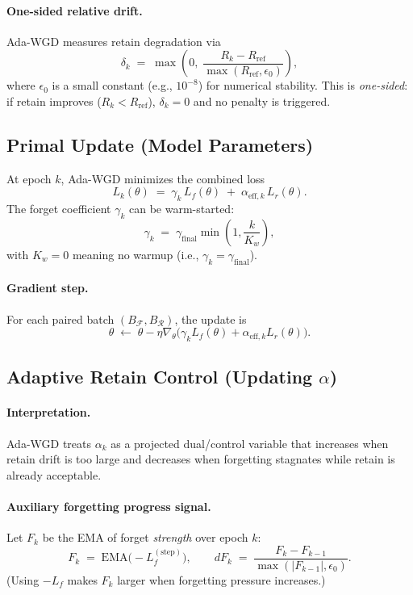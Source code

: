   \paragraph{One-sided relative drift.}
  Ada-WGD measures retain degradation via
  \[
  \delta_k
  \;=\;
  \max\!\left(
  0,\;
  \frac{R_k - R_{\mathrm{ref}}}{\max(R_{\mathrm{ref}},\epsilon_0)}
  \right),
  \]
  where $\epsilon_0$ is a small constant (e.g., $10^{-8}$) for numerical stability.
  This is \emph{one-sided}: if retain improves ($R_k<R_{\mathrm{ref}}$), $\delta_k=0$ and no penalty is triggered.

  \subsection{Primal Update (Model Parameters)}

  At epoch $k$, Ada-WGD minimizes the combined loss
  \[
  L_k(\theta)
  \;=\;
  \gamma_k\,L_f(\theta)\;+\;\alpha_{\mathrm{eff},k}\,L_r(\theta).
  \]
  The forget coefficient $\gamma_k$ can be warm-started:
  \[
  \gamma_k
  \;=\;
  \gamma_{\mathrm{final}}
  \min\!\left(1,\frac{k}{K_w}\right),
  \]
  with $K_w=0$ meaning no warmup (i.e., $\gamma_k=\gamma_{\mathrm{final}}$).

  \paragraph{Gradient step.}
  For each paired batch $(B_{\mathcal{F}},B_{\mathcal{R}})$, the update is
  \[
  \theta \;\leftarrow\; \theta - \eta \nabla_\theta \Big(\gamma_k L_f(\theta) + \alpha_{\mathrm{eff},k} L_r(\theta)\Big).
  \]

  \subsection{Adaptive Retain Control (Updating $\alpha$)}

  \paragraph{Interpretation.}
  Ada-WGD treats $\alpha_k$ as a projected dual/control variable that increases when retain drift is too large
  and decreases when forgetting stagnates while retain is already acceptable.

  \paragraph{Auxiliary forgetting progress signal.}
  Let $F_k$ be the EMA of forget \emph{strength} over epoch $k$:
  \[
  F_k \;=\; \mathrm{EMA}\big(-L_f^{(\mathrm{step})}\big),
  \qquad
  dF_k \;=\; \frac{F_k - F_{k-1}}{\max(|F_{k-1}|,\epsilon_0)}.
  \]
  (Using $-L_f$ makes $F_k$ larger when forgetting pressure increases.)

